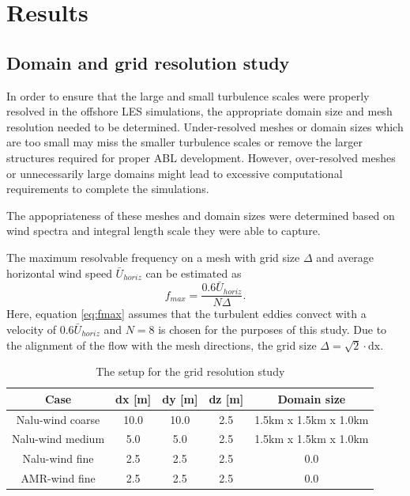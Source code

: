 \section{Results}

\subsection{\label{sec:gridstudy}Domain and grid resolution study}

In order to ensure that the large and small turbulence scales were
properly resolved in the offshore LES simulations, the appropriate
domain size and mesh resolution needed to be determined.
Under-resolved meshes or domain sizes which are too small may miss the
smaller turbulence scales or remove the larger structures required for
proper ABL development.  However, over-resolved meshes or
unnecessarily large domains might lead to excessive computational
requirements to complete the simulations.

The appopriateness of these meshes and domain sizes were determined
based on wind spectra and integral length scale they were able to capture.

The maximum resolvable frequency on a mesh with grid size $\Delta$ and
average horizontal wind speed $\bar{U}_{horiz}$ can be estimated as
\begin{equation}
  \label{eq:fmax}
  f_{max} = \frac{0.6\bar{U}_{horiz}}{N\Delta}.
\end{equation}
Here, equation \ref{eq:fmax} assumes that the turbulent eddies convect
with a velocity of $0.6\bar{U}_{horiz}$ and $N=8$ is chosen for the
purposes of this study.  Due to the alignment of the flow with the
mesh directions, the grid size $\Delta = \sqrt{2}\cdot \textrm{dx}$.

\begin{table}
\caption{\label{tab:GridStudySetup} The setup for the grid resolution study} \centering
\begin{tabular}{ccccc}
  \hline
  Case              & dx [m] & dy [m] & dz [m] & Domain size \\
  \hline
  Nalu-wind coarse  &  10.0  & 10.0   & 2.5 & 1.5km x 1.5km x 1.0km  \\
  Nalu-wind medium  &   5.0  &  5.0   & 2.5 & 1.5km x 1.5km x 1.0km  \\
  Nalu-wind fine    &   2.5  &  2.5   & 2.5 & 0.0 \\
  AMR-wind fine     &   2.5  &  2.5   & 2.5 & 0.0 \\
\hline
\end{tabular}
\end{table}

